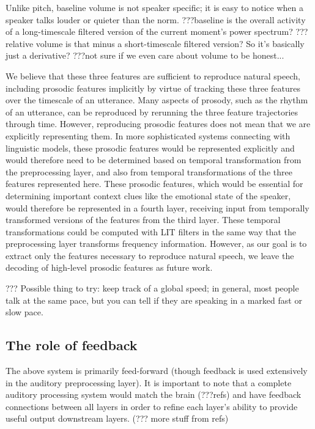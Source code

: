 Unlike pitch, baseline volume
is not speaker specific;
it is easy to notice when a speaker
talks louder or quieter
than the norm.
???baseline is the overall activity
of a long-timescale filtered version
of the current moment's power spectrum?
???relative volume is that minus a
short-timescale filtered version?
So it's basically just a derivative?
???not sure if we even care about volume
to be honest...

We believe that these three features
are sufficient to reproduce natural speech,
including prosodic features implicitly
by virtue of tracking these three features
over the timescale of an utterance.
Many aspects of prosody,
such as the rhythm of an utterance,
can be reproduced by rerunning
the three feature trajectories through time.
However, reproducing prosodic features
does not mean that we are explicitly
representing them.
In more sophisticated systems
connecting with linguistic models,
these prosodic features would
be represented explicitly
and would therefore need to be
determined based on temporal transformation
from the preprocessing layer,
and also from temporal transformations
of the three features represented here.
These prosodic features,
which would be essential for determining
important context clues
like the emotional state of the speaker,
would therefore be represented in
a fourth layer, receiving input from
temporally transformed versions of
the features from the third layer.
These temporal transformations
could be computed with LIT filters
in the same way that the preprocessing layer
transforms frequency information.
However, as our goal is to
extract only the features necessary
to reproduce natural speech,
we leave the decoding of high-level prosodic features
as future work.

??? Possible thing to try: keep track of a global
speed; in general, most people talk at the same pace,
but you can tell if they are speaking in a
marked fast or slow pace.

\subsection{The role of feedback}

The above system is primarily feed-forward
(though feedback is used extensively in the
auditory preprocessing layer).
It is important to note that
a complete auditory processing system
would match the brain (???refs) and have
feedback connections between all layers
in order to refine each layer's ability
to provide useful output downstream layers.
(??? more stuff from refs)


